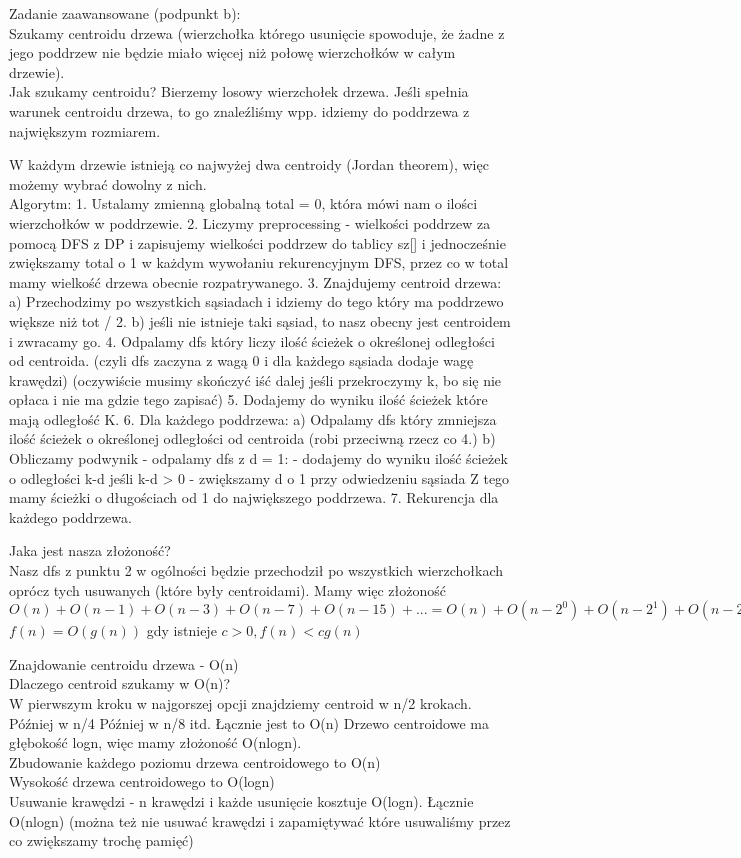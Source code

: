 \documentclass[12pt]{article}
\begin{document}
Zadanie zaawansowane (podpunkt b):\\

Szukamy centroidu drzewa (wierzchołka którego usunięcie spowoduje, że żadne z jego poddrzew nie będzie miało więcej niż połowę wierzchołków w całym drzewie).\\

Jak szukamy centroidu?
Bierzemy losowy wierzchołek drzewa. Jeśli spełnia warunek centroidu drzewa, to go znaleźliśmy wpp. idziemy do poddrzewa z największym rozmiarem.

W każdym drzewie istnieją co najwyżej dwa centroidy (Jordan theorem), więc możemy wybrać dowolny z nich.\\ 

Algorytm:
1. Ustalamy zmienną globalną total = 0, która mówi nam o ilości wierzchołków w poddrzewie.
2. Liczymy preprocessing - wielkości poddrzew za pomocą DFS z DP i zapisujemy wielkości poddrzew do tablicy sz[] i jednocześnie zwiększamy total o 1 w każdym wywołaniu rekurencyjnym DFS, przez co w total mamy wielkość drzewa obecnie rozpatrywanego.
3. Znajdujemy centroid drzewa:
a) Przechodzimy po wszystkich sąsiadach i idziemy do tego który ma poddrzewo większe niż tot / 2.
b) jeśli nie istnieje taki sąsiad, to nasz obecny jest centroidem i zwracamy go. 
4. Odpalamy dfs który liczy ilość ścieżek o określonej odległości od centroida. (czyli dfs zaczyna z wagą 0 i dla każdego sąsiada dodaje wagę krawędzi) (oczywiście musimy skończyć iść dalej jeśli przekroczymy k, bo się nie opłaca i nie ma gdzie tego zapisać)
5. Dodajemy do wyniku ilość ścieżek które mają odległość K.
6. Dla każdego poddrzewa:
a) Odpalamy dfs który zmniejsza ilość ścieżek o określonej odległości od centroida (robi przeciwną rzecz co 4.) 
b) Obliczamy podwynik - odpalamy dfs z d = 1:
- dodajemy do wyniku ilość ścieżek o odległości k-d jeśli k-d > 0 
- zwiększamy d o 1 przy odwiedzeniu sąsiada
Z tego mamy ścieżki o długościach od 1 do największego poddrzewa. 
7. Rekurencja dla każdego poddrzewa.


Jaka jest nasza złożoność?\\
Nasz dfs z punktu 2 w ogólności będzie przechodził po wszystkich wierzchołkach oprócz tych usuwanych (które były centroidami). 
Mamy więc złożoność $O(n) + O(n-1) + O(n-3) + O(n-7) + O(n-15) + ... = O(n) + O(n - 2^0) + O(n - 2^1) + O(n - 2^2) + O(n - 2^3) + O(n - 2^k) = O(nlogn)$
$f(n) = O(g(n))$ gdy istnieje $c > 0, f(n) < cg(n)$

Znajdowanie centroidu drzewa - O(n)\\
Dlaczego centroid szukamy w O(n)?\\
W pierwszym kroku w najgorszej opcji znajdziemy centroid w n/2 krokach.
Później w n/4
Później w n/8
itd.
Łącznie jest to O(n) 
Drzewo centroidowe ma głębokość logn, więc mamy złożoność O(nlogn).\\
Zbudowanie każdego poziomu drzewa centroidowego to O(n)\\
Wysokość drzewa centroidowego to O(logn)\\
Usuwanie krawędzi - n krawędzi i każde usunięcie kosztuje O(logn). Łącznie O(nlogn)
(można też nie usuwać krawędzi i zapamiętywać które usuwaliśmy przez co zwiększamy trochę pamięć)\\
\end{document}
